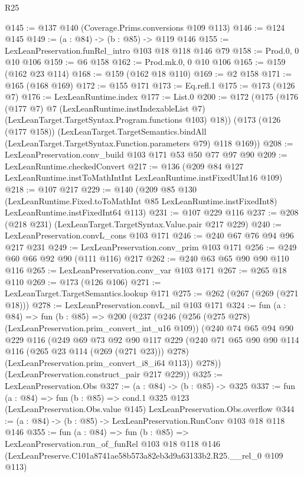 \begin{lexlean}{R25}
\begin{coremodule}
@145 := @137 @140 (Coverage.Prims.conversions @109 @113)
@146 := @124 @145
@149 := (a : @84) -> (b : @85) -> @119 @146
@155 := LexLeanPreservation.funRel_intro @103 @18 @118 @146 @79
@158 := Prod.{0, 0} @10 @106
@159 := @6 @158
@162 := Prod.mk.{0, 0} @10 @106
@165 := @159 (@162 @23 @114)
@168 := @159 (@162 @18 @110)
@169 := @2 @158
@171 := @165 (@168 @169)
@172 := @155 @171
@173 := Eq.refl.{1}
@175 := @173 (@126 @7)
@176 := LexLeanRuntime.index
@177 := List.{0}
@200 := @172
    (@175
      (@176
        (@177 @7)
        @7
        (LexLeanRuntime.instIndexableList @7)
        (LexLeanTarget.TargetSyntax.Program.functions @103)
        @18))
    (@173
      (@126 (@177 @158))
      (LexLeanTarget.TargetSemantics.bindAll
        (LexLeanTarget.TargetSyntax.Function.parameters @79)
        @118
        @169))
@208 := LexLeanPreservation.conv_build @103 @171 @53 @50 @77 @97 @90
@209 := LexLeanRuntime.checkedConvert
@217 := @136 (@209 @84 @127 LexLeanRuntime.instToMathIntInt LexLeanRuntime.instFixedUInt16 @109)
@218 := @107 @217
@229 := @140
    (@209
      @85
      @130
      (LexLeanRuntime.Fixed.toToMathInt @85 LexLeanRuntime.instFixedInt8)
      LexLeanRuntime.instFixedInt64
      @113)
@231 := @107 @229 @116
@237 := @208 (@218 @231) (LexLeanTarget.TargetSyntax.Value.pair @217 @229)
@240 := LexLeanPreservation.convL_cons @103 @171
@246 := @240 @67 @76 @94 @96 @217 @231
@249 := LexLeanPreservation.conv_prim @103 @171
@256 := @249 @60 @66 @92 @90 (@111 @116) @217
@262 := @240 @63 @65 @90 @90 @110 @116
@265 := LexLeanPreservation.conv_var @103 @171
@267 := @265 @18 @110
@269 := @173 (@126 @106)
@271 := LexLeanTarget.TargetSemantics.lookup @171
@275 := @262 (@267 (@269 (@271 @18)))
@278 := LexLeanPreservation.convL_nil @103 @171
@324 := fun (a : @84) =>
  fun (b : @85) =>
  @200
    (@237
      (@246
        (@256 (@275 @278) (LexLeanPreservation.prim_convert_int_u16 @109))
        (@240
          @74
          @65
          @94
          @90
          @229
          @116
          (@249
            @69
            @73
            @92
            @90
            @117
            @229
            (@240 @71 @65 @90 @90 @114 @116 (@265 @23 @114 (@269 (@271 @23))) @278)
            (LexLeanPreservation.prim_convert_i8_i64 @113))
          @278))
      (LexLeanPreservation.construct_pair @217 @229))
@325 := LexLeanPreservation.Obs
@327 := (a : @84) -> (b : @85) -> @325
@337 := fun (a : @84) =>
  fun (b : @85) =>
  cond.{1} @325 @123 (LexLeanPreservation.Obs.value @145) LexLeanPreservation.Obs.overflow
@344 := (a : @84) -> (b : @85) -> LexLeanPreservation.RunConv @103 @18 @118 @146
@355 := fun (a : @84) =>
  fun (b : @85) =>
  LexLeanPreservation.run_of_funRel
    @103
    @18
    @118
    @146
    (LexLeanPreserve.C101a8741ae58b573a82eb3d9a63133b2.R25.__rel_0 @109 @113)
\end{coremodule}
\end{lexlean}

